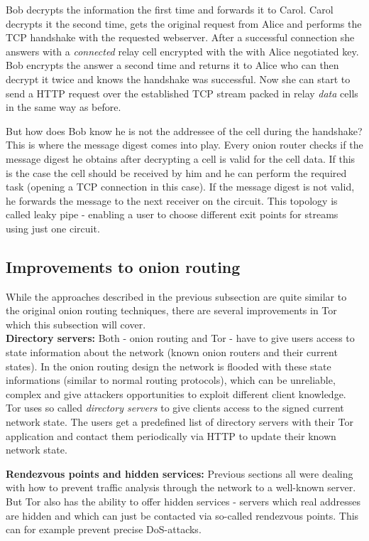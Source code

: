 Bob decrypts the information the first time and forwards it to Carol. Carol decrypts it the second time, gets the original request from Alice and performs the TCP handshake with the requested webserver. After a successful connection she answers with a \textit{connected} relay cell encrypted with the with Alice negotiated key. Bob encrypts the answer a second time and returns it to Alice who can then decrypt it twice and knows the handshake was successful. Now she can start to send a HTTP request over the established TCP stream packed in relay \textit{data} cells in the same way as before.

But how does Bob know he is not the addressee of the cell during the handshake? This is where the message digest comes into play. Every onion router checks if the message digest he obtains after decrypting a cell is valid for the cell data. If this is the case the cell should be received by him and he can perform the required task (opening a TCP connection in this case). If the message digest is not valid, he forwards the message to the next receiver on the circuit. This topology is called leaky pipe - enabling a user to choose different exit points for streams using just one circuit. 

\subsection{Improvements to onion routing}

While the approaches described in the previous subsection are quite similar to the original onion routing techniques, there are several improvements in Tor which this subsection will cover.\\

\textbf{Directory servers:} Both - onion routing and Tor - have to give users access to state information about the network (known onion routers and their current states). In the onion routing design the network is flooded with these state informations (similar to normal routing protocols), which can be unreliable, complex and give attackers opportunities to exploit different client knowledge. Tor uses so called \textit{directory servers} to give clients access to the signed current network state. The users get a predefined list of directory servers with their Tor application and contact them periodically via HTTP to update their known network state.

\textbf{Rendezvous points and hidden services:} Previous sections all were dealing with how to prevent traffic analysis through the network to a well-known server. But Tor also has the ability to offer hidden services - servers which real addresses are hidden and which can just be contacted via so-called rendezvous points. This can for example prevent precise DoS-attacks.

